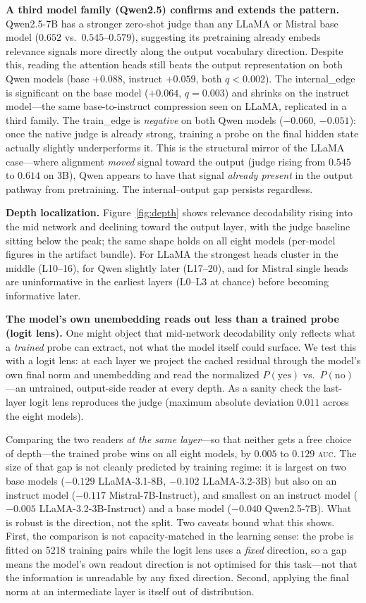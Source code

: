 \documentclass[11pt]{article}
\newcommand{\auc}{\textsc{auc}}
\begin{document}
\textbf{A third model family (Qwen2.5) confirms and extends the pattern.}
Qwen2.5-7B has a stronger zero-shot judge than any LLaMA or Mistral base model
($0.652$ vs.\ $0.545$--$0.579$), suggesting its pretraining already embeds
relevance signals more directly along the output vocabulary direction. Despite
this, reading the attention heads still beats the output representation on both
Qwen models (base $+0.088$, instruct $+0.059$, both $q<0.002$). The
internal\_edge is significant on the base model ($+0.064$, $q{=}0.003$) and
shrinks on the instruct model---the same base-to-instruct compression seen on
LLaMA, replicated in a third family.
The train\_edge is \emph{negative} on both Qwen models ($-0.060$,
$-0.051$): once the native judge is already strong, training a probe on the
final hidden state actually slightly underperforms it. This is the structural
mirror of the LLaMA case---where alignment \emph{moved} signal toward the
output (judge rising from $0.545$ to $0.614$ on 3B), Qwen appears to have that
signal \emph{already present} in the output pathway from pretraining. The
internal--output gap persists regardless.

\textbf{Depth localization.} Figure~\ref{fig:depth} shows relevance
decodability rising into the mid network and declining toward the output layer,
with the judge baseline sitting below the peak; the same shape holds on all
eight models (per-model figures in the artifact bundle). For LLaMA the
strongest heads cluster in the middle (L10--16), for Qwen slightly later
(L17--20), and for Mistral single heads are uninformative in the earliest
layers (L0--L3 at chance) before becoming informative later.

\textbf{The model's own unembedding reads out less than a trained probe
(logit lens).} One might object that mid-network decodability only reflects
what a \emph{trained} probe can extract, not what the model itself could
surface. We test this with a logit lens: at each layer we project the cached
residual through the model's own final norm and unembedding and read the
normalized $P(\text{yes})$ vs.\ $P(\text{no})$---an untrained, output-side
reader at every depth. As a sanity check the last-layer logit lens reproduces
the judge (maximum absolute deviation $0.011$ across the eight models).

Comparing the two readers \emph{at the same layer}---so that neither gets a
free choice of depth---the trained probe wins on all eight models, by
$0.005$ to $0.129$ \auc. The size of that gap is not cleanly predicted by
training regime: it is largest on two base models ($-0.129$ LLaMA-3.1-8B,
$-0.102$ LLaMA-3.2-3B) but also on an instruct model ($-0.117$
Mistral-7B-Instruct), and smallest on an instruct model ($-0.005$
LLaMA-3.2-3B-Instruct) and a base model ($-0.040$ Qwen2.5-7B). What is robust
is the direction, not the split. Two caveats bound what this shows. First, the comparison is
not capacity-matched in the learning sense: the probe is fitted on 5218
training pairs while the logit lens uses a \emph{fixed} direction, so a gap
means the model's own readout direction is not optimised for this task---not
that the information is unreadable by any fixed direction. Second, applying
the final norm at an intermediate layer is itself out of distribution.
\end{document}
